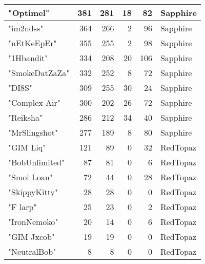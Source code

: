 \documentclass{article}
\begin{document}
\begin{table}[htbp]
\begin{tabular}{|l|r|r|r|r|l|}
"Optimel" & 381 & 281 & 18 & 82 & Sapphire \\ \hline
"im2ndss" & 364 & 266 & 2 & 96 & Sapphire \\ \hline
"nEtKeEpEr" & 355 & 255 & 2 & 98 & Sapphire \\ \hline
"1Hbandit" & 334 & 208 & 20 & 106 & Sapphire \\ \hline
"SmokeDatZaZa" & 332 & 252 & 8 & 72 & Sapphire \\ \hline
"DI8S" & 309 & 255 & 30 & 24 & Sapphire \\ \hline
"Complex Air" & 300 & 202 & 26 & 72 & Sapphire \\ \hline
"Reiksha" & 286 & 212 & 34 & 40 & Sapphire \\ \hline
"MrSlingshot" & 277 & 189 & 8 & 80 & Sapphire \\ \hline
"GIM Liq" & 121 & 89 & 0 & 32 & RedTopaz \\ \hline
"BobUnlimited" & 87 & 81 & 0 & 6 & RedTopaz \\ \hline
"Smol Loan" & 72 & 44 & 0 & 28 & RedTopaz \\ \hline
"SkippyKitty" & 28 & 28 & 0 & 0 & RedTopaz \\ \hline
"F larp" & 25 & 23 & 0 & 2 & RedTopaz \\ \hline
"IronNemoko" & 20 & 14 & 0 & 6 & RedTopaz \\ \hline
"GIM Jxcob" & 19 & 19 & 0 & 0 & RedTopaz \\ \hline
"NeutralBob" & 8 & 8 & 0 & 0 & RedTopaz \\ \hline
\end{tabular}
\end{table}
\end{document}
